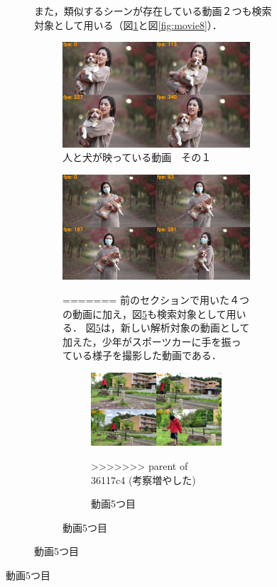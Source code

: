 \documentclass[a4j,12pt,dvipdfmx]{jreport}
\begin{document}
\begin{figure}[H]
\begin{figure}[H]
また，類似するシーンが存在している動画２つも検索対象として用いる（図\ref{fig:movie7}と図\ref{fig:movie8}）．
\begin{figure}[H]
  \centering
  \includegraphics[width=13cm]{image/7_result.jpg}
  \caption{人と犬が映っている動画　その１}
  \label{fig:movie7}
\end{figure}

\begin{figure}[H]
  \centering
  \includegraphics[width=13cm]{image/8_result.jpg}
  \caption{人と犬が映っている動画　その２}
  \label{fig:movie8}
=======
前のセクションで用いた４つの動画に加え，図\ref{fig:movie5}も検索対象として用いる．
図\ref{fig:movie5}は，新しい解析対象の動画として加えた，少年がスポーツカーに手を振っている様子を撮影した動画である．
\begin{figure}[b]
  \centering
  \includegraphics[width=13cm]{image/5_result.jpg}
  \caption{動画5つ目}
  \label{fig:movie5}
>>>>>>> parent of 36117c4 (考察増やした)
\end{figure}


\end{figure}
\end{figure}
\end{figure}
\end{document}

